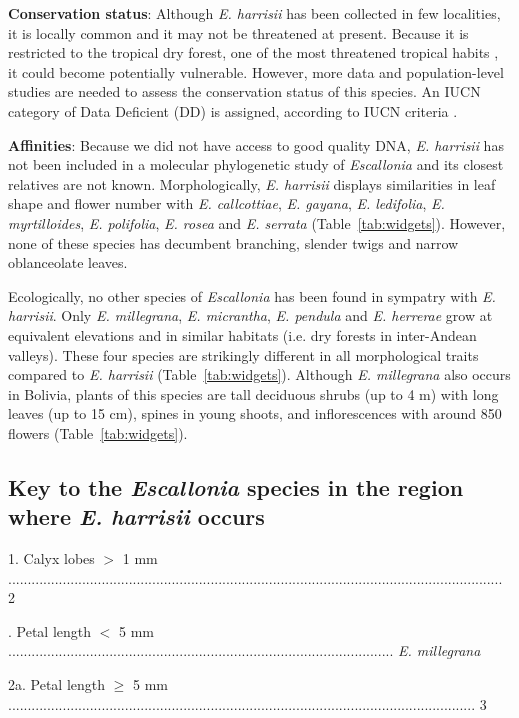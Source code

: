 \documentclass[fleqn,10pt,lineno]{wlpeerj} %
\begin{document}
\textbf{Conservation status}: Although \emph{E. harrisii} has been collected in few localities, it is locally common and it may not be threatened at present. Because it is restricted to the tropical dry forest, one of the most threatened tropical habits \citep{DRYFLOR:2016gr}, it could become potentially vulnerable. However, more data and population-level studies are needed to assess the conservation status of this species. An IUCN category of Data Deficient (DD) is assigned, according to IUCN criteria \citep{IUCN:2012aa}.

\textbf{Affinities}: Because we did not have access to good quality DNA, \emph{E. harrisii} has not been included in a molecular phylogenetic study of \emph{Escallonia} and its closest relatives are not known.  Morphologically, \emph{E. harrisii} displays similarities in leaf shape and flower number with \emph{E. callcottiae}, \emph{E. gayana}, \emph{E. ledifolia}, \emph{E. myrtilloides}, \emph{E. polifolia}, \emph{E. rosea} and \emph{E. serrata} (Table~\ref{tab:widgets}). However, none of these species has decumbent branching, slender twigs and narrow oblanceolate leaves.

Ecologically, no other species of \emph{Escallonia} has been found in sympatry with \emph{E. harrisii}. Only \emph{E. millegrana}, \emph{E. micrantha}, \emph{E. pendula} and \emph{E. herrerae} grow at equivalent elevations and in similar habitats (i.e. dry forests in inter-Andean valleys). These four species are strikingly different in all morphological traits compared to \emph{E. harrisii} (Table~\ref{tab:widgets}). Although \emph{E. millegrana} also occurs in Bolivia, plants of this species are tall deciduous shrubs (up to 4 m) with long leaves (up to 15 cm), spines in young shoots, and inflorescences with around 850 flowers (Table~\ref{tab:widgets}).

\subsection*{Key to the \emph{Escallonia} species in the region where \emph{E. harrisii} occurs}

1. Calyx lobes $>$ 1 mm ............................................................................................................................... 2

. Petal length $<$ 5 mm ................................................................................................... \emph{E. millegrana}

\indent 2a. Petal length $\geq$ 5 mm ........................................................................................................................ 3
\end{document}
